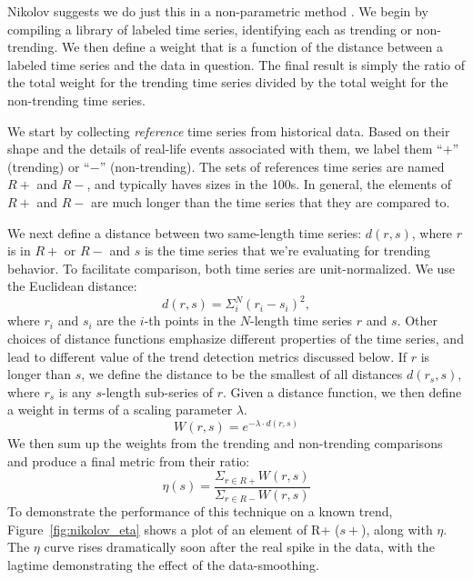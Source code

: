 \documentclass{article}
\begin{document}
Nikolov suggests we do just this in a non-parametric method \cite{Nikolov:2011}. We
begin by compiling a library of labeled time series, identifying each as
trending or non-trending. We then define a weight that is a function of the
distance between a labeled time series and the data in question. The final
result is simply the ratio of the total weight for the trending time series
divided by the total weight for the non-trending time series. 

We start by collecting \textit{reference} time series from historical data. Based on their
shape and the details of real-life events associated with them, we label
them “$+$” (trending) or “$-$” (non-trending). The sets of references time
series are named $R+$ and $R-$, and typically haves sizes in the 100s. 
In general, the elements of $R+$ and $R-$ are much 
longer than the time series that they are compared to. 

We next define a distance between two same-length time series: $d(r,s)$,
where $r$ is in $R+$ or $R-$ and $s$ is the time series that we’re evaluating for
trending behavior. To facilitate comparison, both time series are unit-normalized. 
We use the Euclidean distance:
\begin{equation}
    d(r,s) = \Sigma_i^N(r_i - s_i)^2,
\end{equation}
where $r_i$ and $s_i$ are the $i$-th points in the $N$-length time series $r$ and $s$. Other
choices of distance functions emphasize different properties of the
time series, and lead to different value of the trend detection metrics
discussed below. If $r$ is longer than $s$, we define the distance to be the
smallest of all distances $d(r_s,s)$, where $r_s$ is any $s$-length sub-series of $r$. Given
a distance function, we then define a weight in terms of a scaling
parameter $\lambda$. 
\begin{equation}
    W(r,s) = e^{-\lambda\cdot d(r,s)}
\end{equation}
We then sum up the weights from the trending and non-trending comparisons and
produce a final metric from their ratio:
\begin{equation}
    \eta(s) = \frac{\Sigma_{r\in R+}W(r,s)}{\Sigma_{r\in R-}W(r,s)} 
\end{equation}
To demonstrate the performance of this technique on a known trend,
Figure~\ref{fig:nikolov_eta} shows a plot of an element of R+ ($s+$), along with $\eta$.
The $\eta$ curve rises dramatically soon after the real spike in the
data, with the lagtime demonstrating the effect of the data-smoothing.
\end{document}
